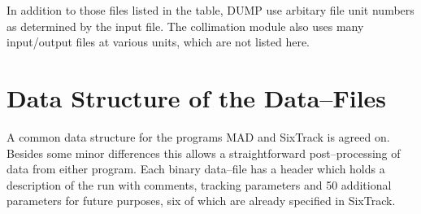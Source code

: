 \documentclass[a4paper,11pt]{report}
\begin{document}

In addition to those files listed in the table, DUMP use arbitary file unit numbers as determined by the input file. The collimation module also uses many input/output files at various units, which are not listed here.

\chapter{Data Structure of the Data--Files} \label{Header}

A common data structure for the programs MAD and SixTrack is agreed
on. Besides some minor differences this allows a straightforward
post--processing of data from either program. Each binary data--file
has a header which holds a description of the run with comments,
tracking parameters and 50 additional parameters for future purposes,
six of which are already specified in SixTrack\@.
\end{document}
